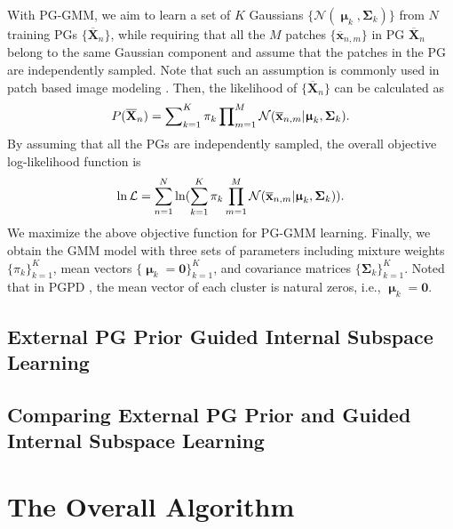 \documentclass[10pt,twocolumn,letterpaper]{article}
\begin{document}
With PG-GMM, we aim to learn a set of $K$ Gaussians $\{\mathcal{N}(\boldsymbol{\upmu}_{k},\mathbf{\Sigma}_{k})\}$ from $N$ training PGs $\{\mathbf{\overline{X}}_{n}\}$, while requiring that all the $M$ patches $\{\mathbf{\overline{x}}_{n,m}\}$  in PG $\mathbf{\overline{X}}_{n}$ belong to the same Gaussian component and assume that the patches in the PG are independently sampled. Note that such an assumption is commonly used in patch based image modeling \cite{ksvd,lssc}. Then, the likelihood of $\{\mathbf{\overline{X}}_{n}\}$ can be calculated as
\begin{equation}\label{equ3}
\setlength{\abovedisplayskip}{3pt}
\setlength{\belowdisplayskip}{3pt}
P(\mathbf{\overline{X}}_{n})  = \sum\nolimits_{k=1}^{K}\pi_{k}\prod\nolimits_{m=1}^{M}\mathcal{N}(\mathbf{\overline{x}}_{n,m}|\boldsymbol{\upmu}_{k},\mathbf{\Sigma}_{k}).
\end{equation}
By assuming that all the PGs are independently sampled, the overall objective log-likelihood function is
\begin{equation}\label{equ4}
\setlength{\abovedisplayskip}{3pt}
\setlength{\belowdisplayskip}{3pt}
\begin{split}
\ln\mathcal{L}=\sum_{n=1}^{N} \ln(\sum_{k=1}^{K}\pi_{k}\prod_{m=1}^{M}\mathcal{N}(\mathbf{\overline{x}}_{n,m}|\boldsymbol{\upmu}_{k},\mathbf{\Sigma}_{k})).
\end{split}
\end{equation} 
We maximize the above objective function for PG-GMM learning. Finally, we obtain the GMM model with three sets of parameters including mixture weights $\{\pi_{k}\}_{k=1}^{K}$, mean vectors $\{\boldsymbol{\upmu}_{k}=\mathbf{0}\}_{k=1}^{K}$, and covariance matrices $\{\mathbf{\Sigma}_{k}\}_{k=1}^{K}$. Noted that in PGPD \cite{pgpd}, the mean vector of each cluster is natural zeros, i.e., $\boldsymbol{\upmu}_{k}=\mathbf{0}$.

\subsection{External PG Prior Guided Internal Subspace Learning}


\subsection{Comparing External PG Prior and Guided Internal Subspace Learning}


\section{The Overall Algorithm}
\end{document}
